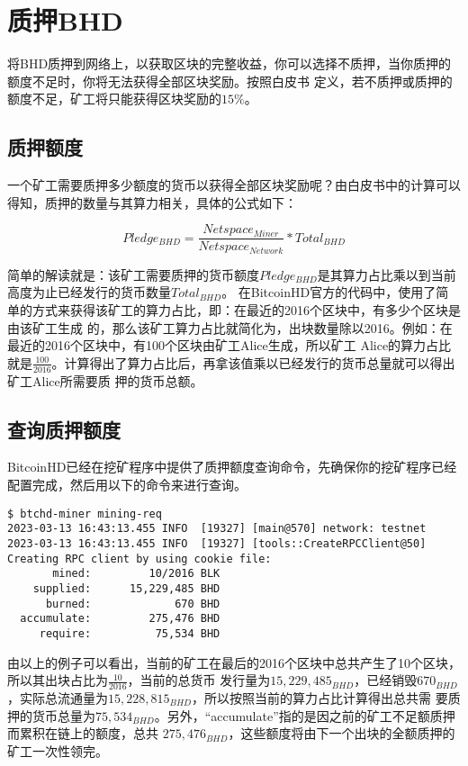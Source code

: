 \section{质押BHD}
\begin{flushleft}
    将BHD质押到网络上，以获取区块的完整收益，你可以选择不质押，当你质押的额度不足时，你将无法获得全部区块奖励。按照白皮书
    定义，若不质押或质押的额度不足，矿工将只能获得区块奖励的$15\%$。
\end{flushleft}
\subsection{质押额度}
\begin{flushleft}
    一个矿工需要质押多少额度的货币以获得全部区块奖励呢？由白皮书中的计算可以得知，质押的数量与其算力相关，具体的公式如下：
\end{flushleft}
\begin{equation}
    Pledge_{BHD}=\frac{Netspace_{Miner}}{Netspace_{Network}}*Total_{BHD}
\end{equation}
\begin{flushleft}
    简单的解读就是：该矿工需要质押的货币额度$Pledge_{BHD}$是其算力占比乘以到当前高度为止已经发行的货币数量$Total_{BHD}$。
    在BitcoinHD官方的代码中，使用了简单的方式来获得该矿工的算力占比，即：在最近的2016个区块中，有多少个区块是由该矿工生成
    的，那么该矿工算力占比就简化为，出块数量除以2016。例如：在最近的2016个区块中，有100个区块由矿工Alice生成，所以矿工
    Alice的算力占比就是$\frac{100}{2016}$。计算得出了算力占比后，再拿该值乘以已经发行的货币总量就可以得出矿工Alice所需要质
    押的货币总额。
\end{flushleft}
\subsection{查询质押额度}
\begin{flushleft}
    BitcoinHD已经在挖矿程序中提供了质押额度查询命令，先确保你的挖矿程序已经配置完成，然后用以下的命令来进行查询。
\end{flushleft}
\scriptsize
\begin{verbatim}
$ btchd-miner mining-req
2023-03-13 16:43:13.455 INFO  [19327] [main@570] network: testnet
2023-03-13 16:43:13.455 INFO  [19327] [tools::CreateRPCClient@50] Creating RPC client by using cookie file:
       mined:         10/2016 BLK
    supplied:      15,229,485 BHD
      burned:             670 BHD
  accumulate:         275,476 BHD
     require:          75,534 BHD
\end{verbatim}
\normalsize
\begin{flushleft}
    由以上的例子可以看出，当前的矿工在最后的2016个区块中总共产生了10个区块，所以其出块占比为$\frac{10}{2016}$，当前的总货币
    发行量为$15,229,485_{BHD}$，已经销毁$670_{BHD}$，实际总流通量为$15,228,815_{BHD}$，所以按照当前的算力占比计算得出总共需
    要质押的货币总量为$75,534_{BHD}$。另外，``accumulate''指的是因之前的矿工不足额质押而累积在链上的额度，总共
    $275,476_{BHD}$，这些额度将由下一个出块的全额质押的矿工一次性领完。
\end{flushleft}
